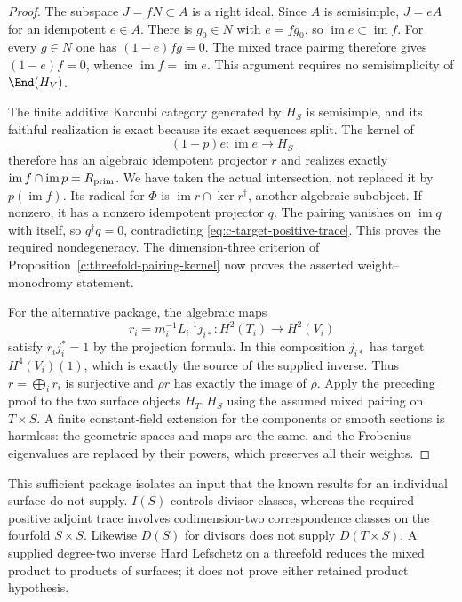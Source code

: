 \begin{proof}
The subspace $J=fN\subset A$ is a right ideal.
Since $A$ is semisimple, $J=eA$ for an idempotent $e\in A$.
There is $g_0\in N$ with $e=fg_0$, so
$\operatorname{im}e\subset\operatorname{im}f$.
For every $g\in N$ one has $(1-e)fg=0$.
The mixed trace pairing therefore gives $(1-e)f=0$, whence
$\operatorname{im}f=\operatorname{im}e$.
This argument requires no semisimplicity of $\End(H_V)$.

The finite additive Karoubi category generated by $H_S$
is semisimple, and its faithful realization is exact because
its exact sequences split. The kernel of
\[
 (1-p)e:\operatorname{im}e\longrightarrow H_S
\]
therefore has an algebraic idempotent projector $r$ and
realizes exactly
$\operatorname{im}f\cap\operatorname{im}p=R_{\rm prim}$.
We have taken the actual intersection, not replaced it
by $p(\operatorname{im}f)$.
Its radical for $\Phi$ is
$\operatorname{im}r\cap\ker r^\dagger$, another algebraic
subobject. If nonzero, it has a nonzero idempotent projector $q$.
The pairing vanishes on $\operatorname{im}q$ with itself,
so $q^\dagger q=0$, contradicting
\eqref{eq:c-target-positive-trace}.
This proves the required nondegeneracy. The dimension-three
criterion of Proposition~\ref{c:threefold-pairing-kernel}
now proves the asserted weight--monodromy statement.

For the alternative package, the algebraic maps
\[
 r_i=m_i^{-1}L_i^{-1}j_{i*}:H^2(T_i)\longrightarrow H^2(V_i)
\]
satisfy $r_i j_i^*=1$ by the projection formula.
In this composition $j_{i*}$ has target $H^4(V_i)(1)$,
which is exactly the source of the supplied inverse.
Thus $r=\bigoplus_i r_i$ is surjective and
$\rho r$ has exactly the image of $\rho$.
Apply the preceding proof to the two surface objects $H_T,H_S$
using the assumed mixed pairing on $T\times S$.
A finite constant-field extension for the components or smooth
sections is harmless: the geometric spaces and maps are the same,
and the Frobenius eigenvalues are replaced by their powers,
which preserves all their weights.
\end{proof}

This sufficient package isolates an input that the known results
for an individual surface do not supply.
$I(S)$ controls divisor classes, whereas the required
positive adjoint trace involves codimension-two correspondence
classes on the fourfold $S\times S$.
Likewise $D(S)$ for divisors does not supply $D(T\times S)$.
A supplied degree-two inverse Hard Lefschetz on a threefold
reduces the mixed product to products of surfaces; it does not
prove either retained product hypothesis.
